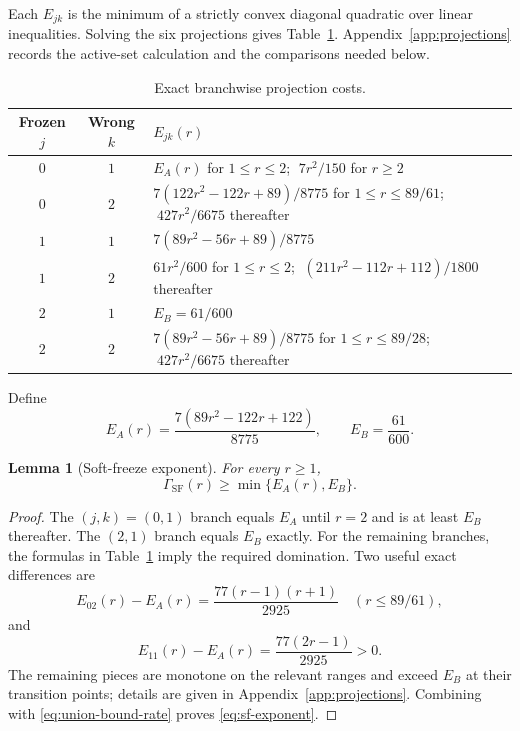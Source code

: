\documentclass[11pt]{article}
\newtheorem{lemma}[theorem]{Lemma}
\theoremstyle{definition}
\theoremstyle{remark}
\newcommand{\SF}{\mathrm{SF}}
\begin{document}
Each $E_{jk}$ is the minimum of a strictly convex diagonal quadratic over linear inequalities. Solving the six projections gives Table~\ref{tab:branch-costs}. Appendix~\ref{app:projections} records the active-set calculation and the comparisons needed below.

\begin{table}[ht]
\centering
\small
\caption{Exact branchwise projection costs.}
\label{tab:branch-costs}
\begin{tabular}{c c l}
\toprule
Frozen $j$ & Wrong $k$ & $E_{jk}(r)$ \\
\midrule
$0$ & $1$ & $E_A(r)$ for $1\le r\le2$; $\;7r^2/150$ for $r\ge2$ \\
$0$ & $2$ & $7(122r^2-122r+89)/8775$ for $1\le r\le89/61$; $\;427r^2/6675$ thereafter \\
$1$ & $1$ & $7(89r^2-56r+89)/8775$ \\
$1$ & $2$ & $61r^2/600$ for $1\le r\le2$; $\;(211r^2-112r+112)/1800$ thereafter \\
$2$ & $1$ & $E_B=61/600$ \\
$2$ & $2$ & $7(89r^2-56r+89)/8775$ for $1\le r\le89/28$; $\;427r^2/6675$ thereafter \\
\bottomrule
\end{tabular}
\end{table}

Define
\begin{equation}
E_A(r)=\frac{7(89r^2-122r+122)}{8775},
\qquad
E_B=\frac{61}{600}.
\label{eq:EAEB}
\end{equation}

\begin{lemma}[Soft-freeze exponent]
For every $r\ge1$,
\begin{equation}
\Gamma_{\SF}(r)\ge \min\{E_A(r),E_B\}.
\label{eq:sf-exponent}
\end{equation}
\end{lemma}
\begin{proof}
The $(j,k)=(0,1)$ branch equals $E_A$ until $r=2$ and is at least $E_B$ thereafter. The $(2,1)$ branch equals $E_B$ exactly. For the remaining branches, the formulas in Table~\ref{tab:branch-costs} imply the required domination. Two useful exact differences are
\[
E_{02}(r)-E_A(r)=\frac{77(r-1)(r+1)}{2925}
\quad (r\le 89/61),
\]
and
\[
E_{11}(r)-E_A(r)=\frac{77(2r-1)}{2925}>0.
\]
The remaining pieces are monotone on the relevant ranges and exceed $E_B$ at their transition points; details are given in Appendix~\ref{app:projections}. Combining with \eqref{eq:union-bound-rate} proves \eqref{eq:sf-exponent}.
\end{proof}
\end{document}
